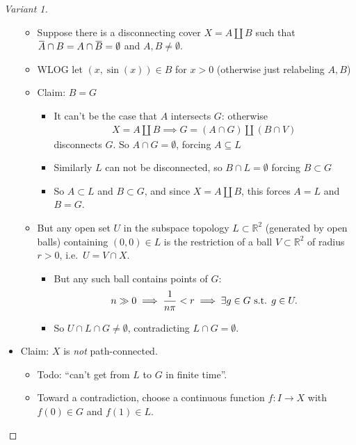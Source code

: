 \begin{solution}
\begin{proof}[Variant 1]
\begin{itemize}
  \begin{itemize}
  \tightlist
  \item
    Suppose there is a disconnecting cover \(X = A{\textstyle\coprod}B\)
    such that
    \(\mkern 1.5mu\overline{\mkern-1.5muA\mkern-1.5mu}\mkern 1.5mu \cap B = A\cap\mkern 1.5mu\overline{\mkern-1.5muB\mkern-1.5mu}\mkern 1.5mu = \emptyset\)
    and \(A, B \neq \emptyset\).
  \item
    WLOG let \((x, \sin(x))\in B\) for \(x>0\) (otherwise just
    relabeling \(A, B\))
  \item
    Claim: \(B = G\)

    \begin{itemize}
    \tightlist
    \item
      It can't be the case that \(A\) intersects \(G\): otherwise
      \begin{align*}X = A{\textstyle\coprod}B \implies G = (A\cap G) {\textstyle\coprod}(B \cap V)\end{align*}
      disconnects \(G\). So \(A\cap G = \emptyset\), forcing
      \(A \subseteq L\)
    \item
      Similarly \(L\) can not be disconnected, so
      \(B\cap L = \emptyset\) forcing \(B \subset G\)
    \item
      So \(A \subset L\) and \(B\subset G\), and since
      \(X = A{\textstyle\coprod}B\), this forces \(A = L\) and
      \(B = G\).
    \end{itemize}
  \item
    But any open set \(U\) in the subspace topology
    \(L\subset {\mathbb{R}}^2\) (generated by open balls) containing
    \((0, 0) \in L\) is the restriction of a ball
    \(V \subset {\mathbb{R}}^2\) of radius \(r>0\),
    i.e.~\(U = V \cap X\).

    \begin{itemize}
    \tightlist
    \item
      But any such ball contains points of \(G\):
      \begin{align*}n\gg 0 \implies {1 \over n\pi} < r \implies \exists g\in G \text{ s.t. } g\in U.\end{align*}
    \item
      So \(U \cap L \cap G \neq \emptyset\), contradicting
      \(L\cap G = \emptyset\).
    \end{itemize}
  \end{itemize}
\item
  Claim: \(X\) is \emph{not} path-connected.

  \begin{itemize}
  \item
    Todo: ``can't get from \(L\) to \(G\) in finite time''.
  \item
    Toward a contradiction, choose a continuous function \(f:I \to X\)
    with \(f(0) \in G\) and \(f(1) \in L\).


\end{itemize}
\end{itemize}
\end{proof}
\end{solution}
